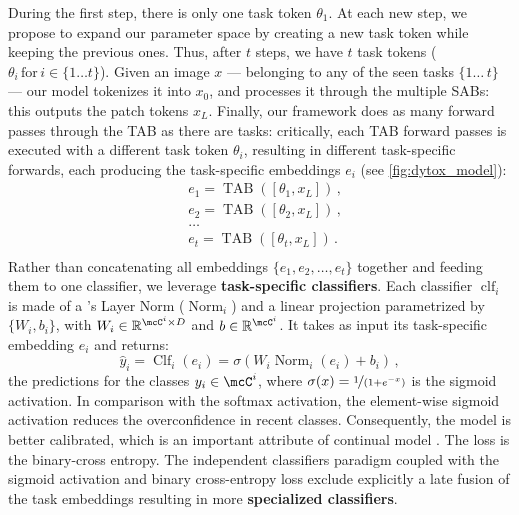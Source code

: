 During the first step, there is only one task token $\theta_1$. At each new step, we propose to
expand our parameter space by creating a new task token while keeping the previous ones. Thus, after
$t$ steps, we have $t$ task tokens ($\theta_i\,\text{for}\, i\in \{1 \dots t\}$). Given an image $x$
--- belonging to any of the seen tasks $\{1\dots \, t\}$ --- our model tokenizes it into $x_0$, and
processes it through the multiple SABs: this outputs the patch tokens $x_L$. Finally, our framework
does as many forward passes through the TAB as there are tasks: critically, each TAB forward passes
is executed with a different task token $\theta_i$, resulting in different task-specific forwards,
each producing the task-specific embeddings $e_i$ (see \autoref{fig:dytox_model}):
%
\begin{equation}
    \begin{aligned}
         & e_1 = \operatorname{TAB}([\theta_1, x_L])\,, \\
         & e_2 = \operatorname{TAB}([\theta_2, x_L])\,, \\
         & \dots                                        \\
         & e_t = \operatorname{TAB}([\theta_t, x_L])\,. \\
    \end{aligned}
    \label{eq:dytox_multiple_tab}
\end{equation}
%
Rather than concatenating all embeddings $\{e_1, e_2, \dots, e_t\}$ together and feeding them to one
classifier, we leverage \textbf{task-specific classifiers}. Each classifier $\operatorname{clf}_i$
is made of a \citet{ba2016layernorm}'s Layer Norm ($\operatorname{Norm}_i$) and a linear projection
parametrized by $\{W_i, b_i\}$, with $W_i \in \mathbb{R}^{\mcC^i \times D}$ and $b \in
    \mathbb{R}^{\mcC^i}$. It takes as input its task-specific embedding $e_i$ and returns:
%
\begin{equation}
    \hat{y}_i = \operatorname{Clf}_i(e_i) = \sigma(W_i \operatorname{Norm}_i(e_i) + b_i)\,,
    \label{eq:dytox_ind_clf}
\end{equation}
%
the predictions for the classes $y_i \in \mcC^i$, where $\sigma(x) = \nicefrac{1}{(1 + e^{-x})}$ is
the sigmoid activation. In comparison with the softmax activation, the element-wise sigmoid
activation reduces the overconfidence in recent classes. Consequently, the model is better
calibrated, which is an important attribute of continual model
\citep{belouadah2019il2m,wu2019bias_correction,zhao2020weightalignement}. The loss is the
binary-cross entropy. The independent classifiers paradigm \citep{shanahan2021ensembleencoders} coupled with the sigmoid activation and
binary cross-entropy loss exclude explicitly a late fusion \citep{ramachandram2017multimodalreview}
of the task embeddings resulting in more \textbf{specialized classifiers}.

